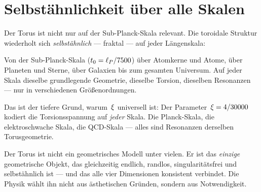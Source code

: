 \section{Selbstähnlichkeit über alle Skalen}

Der Torus ist nicht nur auf der Sub-Planck-Skala relevant. Die toroidale Struktur wiederholt sich \emph{selbstähnlich} --- fraktal --- auf jeder Längenskala:

Von der Sub-Planck-Skala ($t_0 = \ell_P / 7500$) über Atomkerne und Atome, über Planeten und Sterne, über Galaxien bis zum gesamten Universum. Auf jeder Skala dieselbe grundlegende Geometrie, dieselbe Torsion, dieselben Resonanzen --- nur in verschiedenen Größenordnungen.

Das ist der tiefere Grund, warum~$\xi$ universell ist: Der Parameter~$\xi = 4/30000$ kodiert die Torsionsspannung auf \emph{jeder} Skala. Die Planck-Skala, die elektroschwache Skala, die QCD-Skala --- alles sind Resonanzen derselben Torusgeometrie.

\begin{kerngedanke}
Der Torus ist nicht ein geometrisches Modell unter vielen. Er ist das \emph{einzige} geometrische Objekt, das gleichzeitig endlich, randlos, singularitätsfrei und selbstähnlich ist --- und das alle vier Dimensionen konsistent verbindet. Die Physik wählt ihn nicht aus ästhetischen Gründen, sondern aus Notwendigkeit.
\end{kerngedanke}
